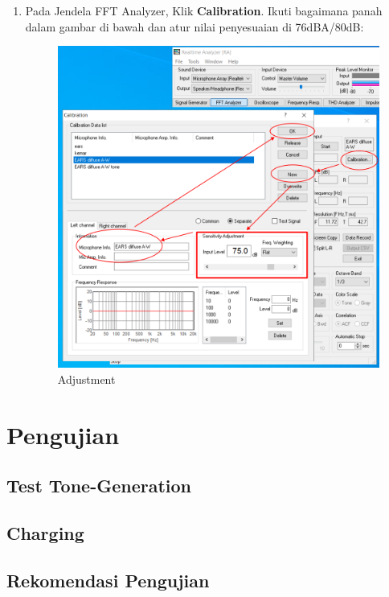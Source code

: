 \documentclass[12pt]{book}
\begin{document}
\begin{enumerate}
    	\newpage
    	\item Pada Jendela FFT Analyzer, Klik \textbf{Calibration}.
    	Ikuti bagaimana panah dalam gambar di bawah dan atur nilai penyesuaian di 76dBA/80dB:

    	\begin{figure}[!ht]
    		\centering
    		\includegraphics[width=\textwidth]{images/kalibrasi/adjustment}
    		\caption{Adjustment}
    	\end{figure}
    \end{enumerate}

    \chapter{Pengujian}

    \section{Test Tone-Generation}

    \section{Charging}

    \section{Rekomendasi Pengujian}
\end{document}
